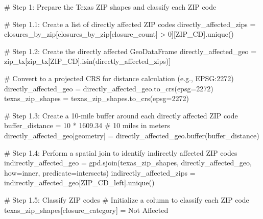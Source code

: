 \documentclass[
  letterpaper,
  DIV=11,
  numbers=noendperiod]{scrartcl}
\newenvironment{Shaded}{\begin{snugshade}}{\end{snugshade}}
\newcommand{\BuiltInTok}[1]{\textcolor[rgb]{0.00,0.23,0.31}{#1}}
\newcommand{\CommentTok}[1]{\textcolor[rgb]{0.37,0.37,0.37}{#1}}
\newcommand{\DecValTok}[1]{\textcolor[rgb]{0.68,0.00,0.00}{#1}}
\newcommand{\FloatTok}[1]{\textcolor[rgb]{0.68,0.00,0.00}{#1}}
\newcommand{\NormalTok}[1]{\textcolor[rgb]{0.00,0.23,0.31}{#1}}
\newcommand{\OperatorTok}[1]{\textcolor[rgb]{0.37,0.37,0.37}{#1}}
\newcommand{\StringTok}[1]{\textcolor[rgb]{0.13,0.47,0.30}{#1}}
\begin{document}
\begin{Shaded}
\begin{Highlighting}[]
\CommentTok{\# Step 1: Prepare the Texas ZIP shapes and classify each ZIP code}

\CommentTok{\# Step 1.1: Create a list of directly affected ZIP codes}
\NormalTok{directly\_affected\_zips }\OperatorTok{=}\NormalTok{ closures\_by\_zip[closures\_by\_zip[}\StringTok{\textquotesingle{}closure\_count\textquotesingle{}}\NormalTok{] }\OperatorTok{\textgreater{}} \DecValTok{0}\NormalTok{][}\StringTok{\textquotesingle{}ZIP\_CD\textquotesingle{}}\NormalTok{].unique()}

\CommentTok{\# Step 1.2: Create the directly affected GeoDataFrame}
\NormalTok{directly\_affected\_geo }\OperatorTok{=}\NormalTok{ zip\_tx[zip\_tx[}\StringTok{\textquotesingle{}ZIP\_CD\textquotesingle{}}\NormalTok{].isin(directly\_affected\_zips)]}

\CommentTok{\# Convert to a projected CRS for distance calculation (e.g., EPSG:2272)}
\NormalTok{directly\_affected\_geo }\OperatorTok{=}\NormalTok{ directly\_affected\_geo.to\_crs(epsg}\OperatorTok{=}\DecValTok{2272}\NormalTok{)}
\NormalTok{texas\_zip\_shapes }\OperatorTok{=}\NormalTok{ texas\_zip\_shapes.to\_crs(epsg}\OperatorTok{=}\DecValTok{2272}\NormalTok{)}

\CommentTok{\# Step 1.3: Create a 10{-}mile buffer around each directly affected ZIP code}
\NormalTok{buffer\_distance }\OperatorTok{=} \DecValTok{10} \OperatorTok{*} \FloatTok{1609.34}  \CommentTok{\# 10 miles in meters}
\NormalTok{directly\_affected\_geo[}\StringTok{\textquotesingle{}geometry\textquotesingle{}}\NormalTok{] }\OperatorTok{=}\NormalTok{ directly\_affected\_geo.}\BuiltInTok{buffer}\NormalTok{(buffer\_distance)}

\CommentTok{\# Step 1.4: Perform a spatial join to identify indirectly affected ZIP codes}
\NormalTok{indirectly\_affected\_geo }\OperatorTok{=}\NormalTok{ gpd.sjoin(texas\_zip\_shapes, directly\_affected\_geo, how}\OperatorTok{=}\StringTok{\textquotesingle{}inner\textquotesingle{}}\NormalTok{, predicate}\OperatorTok{=}\StringTok{\textquotesingle{}intersects\textquotesingle{}}\NormalTok{)}
\NormalTok{indirectly\_affected\_zips }\OperatorTok{=}\NormalTok{ indirectly\_affected\_geo[}\StringTok{\textquotesingle{}ZIP\_CD\_left\textquotesingle{}}\NormalTok{].unique()}

\CommentTok{\# Step 1.5: Classify ZIP codes}
\CommentTok{\# Initialize a column to classify each ZIP code}
\NormalTok{texas\_zip\_shapes[}\StringTok{\textquotesingle{}closure\_category\textquotesingle{}}\NormalTok{] }\OperatorTok{=} \StringTok{\textquotesingle{}Not Affected\textquotesingle{}}


\end{Highlighting}
\end{Shaded}
\end{document}
